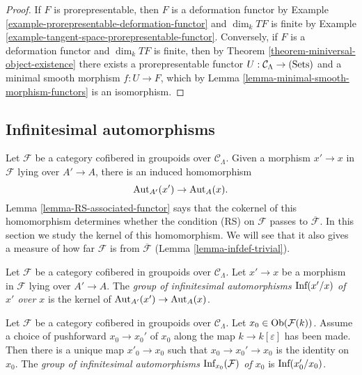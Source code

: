 \begin{proof}
If $F$ is prorepresentable, then $F$ is a deformation functor by Example 
\ref{example-prorepresentable-deformation-functor} and $\dim_k TF$ is finite by 
Example \ref{example-tangent-space-prorepresentable-functor}.  Conversely, if 
$F$ is a deformation functor and $\dim_k TF$ is finite, then by Theorem 
\ref{theorem-miniversal-object-existence} there exists a prorepresentable 
functor $U: \mathcal C_{\Lambda} \rightarrow \textnormal{(Sets)}$ and a minimal 
smooth morphism $f: U \rightarrow F$, which by Lemma 
\ref{lemma-minimal-smooth-morphism-functors} is an isomorphism.
\end{proof}

\subsection{Infinitesimal automorphisms}
\label{subsection-infinitesimal-automorphisms}

\noindent
Let $\mathcal F$ be a category cofibered in groupoids over $\mathcal 
C_{\Lambda}$. Given a morphism $x' \rightarrow x$ in $\mathcal F$ lying over 
$A' \rightarrow A$, there is an induced homomorphism
\[ \textnormal{Aut}_{A'}(x') \rightarrow \textnormal{Aut}_{A}(x). \]
Lemma \ref{lemma-RS-associated-functor} says that the cokernel of this 
homomorphism determines whether the condition (RS) on $\mathcal F$ passes to 
$\overline{\mathcal F}$. In this section we study the kernel of this 
homomorphism. We will see that it also gives a measure of how far $\mathcal F$ 
is from $\overline{\mathcal F}$ (Lemma \ref{lemma-infdef-trivial}).  

\begin{definition}
\label{definition-relative-infinitesimal-auts}
Let $\mathcal F$ be a category cofibered in groupoids over $\mathcal 
C_{\Lambda}$. Let $x' \rightarrow x$ be a morphism in $\mathcal F$ lying over 
$A' \rightarrow A$. The {\it group of infinitesimal automorphisms 
$\textnormal{Inf}({x'/x})$ of $x'$ over $x$} is the kernel of 
$\textnormal{Aut}_{A'}(x') \rightarrow \textnormal{Aut}_{A}(x)$.
\end{definition}

\begin{definition}
\label{definition-infinitesimal-auts}
Let $\mathcal F$ be a category cofibered in groupoids over $\mathcal 
C_{\Lambda}$. Let $x_0 \in \textnormal{Ob}(\mathcal F(k))$. Assume a choice of 
pushforward $x_0 \rightarrow x_0'$ of $x_0$ along the map $k \rightarrow 
k[\varepsilon]$ has been made.  Then there is a unique map $x'_0 \rightarrow 
x_0$ such that $x_0 \rightarrow x_0' \rightarrow x_0$ is the identity on $x_0$. 
The {\it group of infinitesimal automorphisms $\textnormal{Inf}_{x_0}(\mathcal 
F)$ of $x_0$} is $\textnormal{Inf}(x'_0/x_0)$.
\end{definition}

